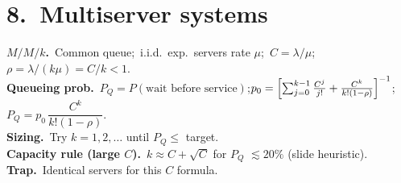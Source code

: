 \section*{8.\ Multiserver systems}
\textbf{$M/M/k$.}\ Common queue;\ i.i.d.\ exp.\ servers rate $\mu$;\ $C=\lambda/\mu$;\ $\rho=\lambda/(k\mu)=C/k<1$.\\
\textbf{Queueing prob.}\ $P_Q=P(\text{wait before service})$;\quad $p_0=\Bigl[\sum_{j=0}^{k-1}\frac{C^j}{j!}+\frac{C^k}{k!(1-\rho)}\Bigr]^{-1}$;\quad $P_Q=p_0\,\dfrac{C^k}{k!(1-\rho)}$.\\
\textbf{Sizing.}\ Try $k=1,2,\ldots$ until $P_Q\le$ target.\\
\textbf{Capacity rule (large $C$).}\ $k\approx C+\sqrt{C}$ for $P_Q$ $\lesssim20\%$ (slide heuristic).\\
\textbf{Trap.}\ Identical servers for this $C$ formula.
